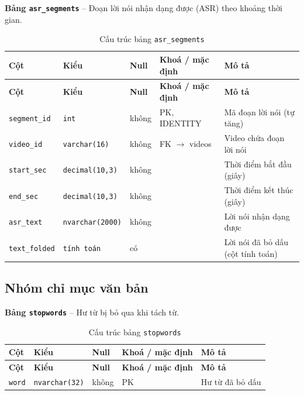 \textbf{Bảng \texttt{asr\_segments}} -- Đoạn lời nói nhận dạng được (ASR) theo khoảng thời gian.

\setlength{\tabcolsep}{4pt}
\begin{longtable}{>{\raggedright\arraybackslash}p{}>{\raggedright\arraybackslash}p{}>{\centering\arraybackslash}p{}>{\raggedright\arraybackslash}p{}>{\raggedright\arraybackslash}p{}}
\caption{Cấu trúc bảng \texttt{asr\_segments}}\label{tab:col_asr_segments}\\
\toprule \textbf{Cột} & \textbf{Kiểu} & \textbf{Null} & \textbf{Khoá / mặc định} & \textbf{Mô tả} \\ \midrule \endfirsthead
\toprule \textbf{Cột} & \textbf{Kiểu} & \textbf{Null} & \textbf{Khoá / mặc định} & \textbf{Mô tả} \\ \midrule \endhead
\bottomrule \endfoot
\texttt{segment\_id} & {\footnotesize\texttt{int}} & không & PK, IDENTITY & Mã đoạn lời nói (tự tăng) \\
\texttt{video\_id} & {\footnotesize\texttt{varchar(16)}} & không & FK $\rightarrow$ videos & Video chứa đoạn lời nói \\
\texttt{start\_sec} & {\footnotesize\texttt{decimal(10,3)}} & không &  & Thời điểm bắt đầu (giây) \\
\texttt{end\_sec} & {\footnotesize\texttt{decimal(10,3)}} & không &  & Thời điểm kết thúc (giây) \\
\texttt{asr\_text} & {\footnotesize\texttt{nvarchar(2000)}} & không &  & Lời nói nhận dạng được \\
\texttt{text\_folded} & {\footnotesize\texttt{tính toán}} & có &  & Lời nói đã bỏ dấu (cột tính toán) \\
\end{longtable}

\subsection{Nhóm chỉ mục văn bản}

\textbf{Bảng \texttt{stopwords}} -- Hư từ bị bỏ qua khi tách từ.

\setlength{\tabcolsep}{4pt}
\begin{longtable}{>{\raggedright\arraybackslash}p{}>{\raggedright\arraybackslash}p{}>{\centering\arraybackslash}p{}>{\raggedright\arraybackslash}p{}>{\raggedright\arraybackslash}p{}}
\caption{Cấu trúc bảng \texttt{stopwords}}\label{tab:col_stopwords}\\
\toprule \textbf{Cột} & \textbf{Kiểu} & \textbf{Null} & \textbf{Khoá / mặc định} & \textbf{Mô tả} \\ \midrule \endfirsthead
\toprule \textbf{Cột} & \textbf{Kiểu} & \textbf{Null} & \textbf{Khoá / mặc định} & \textbf{Mô tả} \\ \midrule \endhead
\bottomrule \endfoot
\texttt{word} & {\footnotesize\texttt{nvarchar(32)}} & không & PK & Hư từ đã bỏ dấu \\
\end{longtable}

